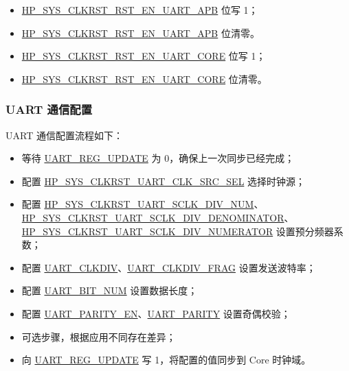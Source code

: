 \documentclass[main\_\_CN.tex]{subfiles}
\begin{document}
\begin{itemize}
    \item  \hyperref[fielddesc:HPSYSCLKRSTRSTENUART0APB]{HP\_SYS\_CLKRST\_RST\_EN\_UART\_APB} 位写 1；
    \item  \hyperref[fielddesc:HPSYSCLKRSTRSTENUART0APB]{HP\_SYS\_CLKRST\_RST\_EN\_UART\_APB} 位清零。
    \item  \hyperref[fielddesc:HPSYSCLKRSTRSTENUART0CORE]{HP\_SYS\_CLKRST\_RST\_EN\_UART\_CORE} 位写 1；
    \item  \hyperref[fielddesc:HPSYSCLKRSTRSTENUART0CORE]{HP\_SYS\_CLKRST\_RST\_EN\_UART\_CORE} 位清零。
\end{itemize}

\subsubsection{UART 通信配置}

UART 通信配置流程如下：
\begin{itemize}
    \item 等待 \hyperref[fielddesc:UARTREGUPDATE]{UART\_REG\_UPDATE} 为 0，确保上一次同步已经完成；
    \item 配置 \hyperref[fielddesc:HPSYSCLKRSTUART0CLKSRCSEL]{HP\_SYS\_CLKRST\_UART\_CLK\_SRC\_SEL} 选择时钟源；
    \item 配置 \hyperref[fielddesc:HPSYSCLKRSTUART0SCLKDIVNUM]{HP\_SYS\_CLKRST\_UART\_SCLK\_DIV\_NUM}、\hyperref[fielddesc:HPSYSCLKRSTUART0SCLKDIVDENOMINATOR]{HP\_SYS\_CLKRST\_UART\_SCLK\_DIV\_DENOMINATOR}、\hyperref[fielddesc:HPSYSCLKRSTUART0SCLKDIVNUMERATOR]{HP\_SYS\_CLKRST\_UART\_SCLK\_DIV\_NUMERATOR} 设置预分频器系数；
    \item 配置 \hyperref[fielddesc:UARTCLKDIV]{UART\_CLKDIV}、\hyperref[fielddesc:UARTCLKDIVFRAG]{UART\_CLKDIV\_FRAG} 设置发送波特率；
    \item 配置 \hyperref[fielddesc:UARTBITNUM]{UART\_BIT\_NUM} 设置数据长度；
    \item 配置 \hyperref[fielddesc:UARTPARITYEN]{UART\_PARITY\_EN}、\hyperref[fielddesc:UARTPARITY]{UART\_PARITY} 设置奇偶校验；
    \item 可选步骤，根据应用不同存在差异；
    \item 向 \hyperref[fielddesc:UARTREGUPDATE]{UART\_REG\_UPDATE} 写 1，将配置的值同步到 Core 时钟域。
\end{itemize}
\end{document}
